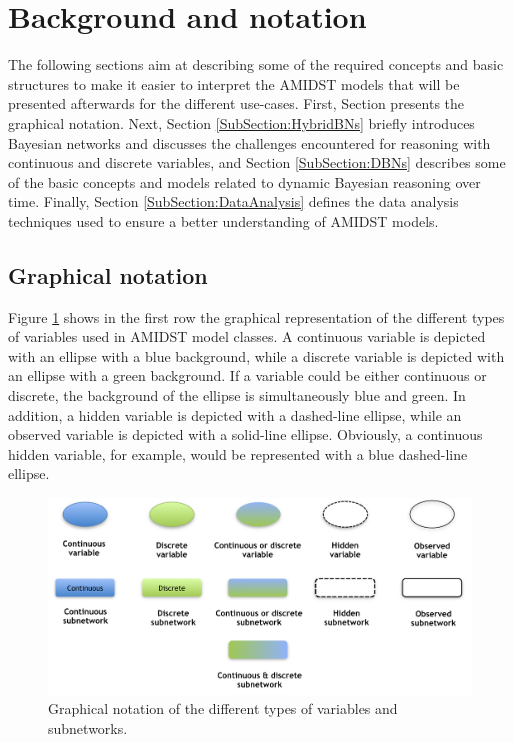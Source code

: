 \section{Background and notation}\label{Section:Preliminaries}

The following sections aim at describing some of the required concepts and basic structures to make it easier to interpret the AMIDST models that will be presented afterwards for the different use-cases. First, Section \label{SubSection:GraphicalNotation} presents the graphical notation. Next, Section \ref{SubSection:HybridBNs} briefly introduces Bayesian networks and discusses the challenges encountered for reasoning with continuous and discrete variables, and Section \ref{SubSection:DBNs} describes some of the basic concepts and models related to dynamic Bayesian reasoning over time. Finally, Section \ref{SubSection:DataAnalysis} defines the data analysis techniques used to ensure a better understanding of AMIDST models.


\subsection{Graphical notation}\label{SubSection:GraphicalNotation}

Figure \ref{Figure:PreliminariesNotation} shows in the first row the graphical representation of the different types of variables used in AMIDST model classes. A continuous variable is depicted with an ellipse with a blue background, while a discrete variable is depicted with an ellipse with a green background. If a variable could be either continuous or discrete, the background of the ellipse is simultaneously blue and green. In addition, a hidden variable is depicted with a dashed-line ellipse, while an observed variable is depicted with a solid-line ellipse. Obviously, a continuous hidden variable, for example, would be represented with a blue dashed-line ellipse.

\begin{figure}[ht!]
\begin{center}
\includegraphics[scale=0.55]{./figures/PreliminariesNotation}
\caption{\label{Figure:PreliminariesNotation}Graphical notation of the different types of variables and subnetworks.
}
\end{center}
\end{figure}

